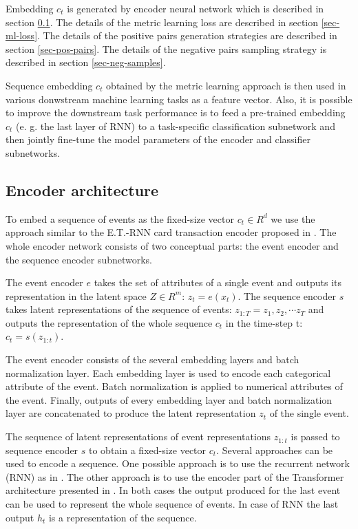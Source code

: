 \documentclass[sigconf, anonymous]{acmart}
\begin{document}
Embedding $c_t$ is generated by encoder neural network which is described in section \ref{sec-enc-arch}. The details of the metric learning loss are described in section \ref{sec-ml-loss}. The details of the positive pairs generation strategies are described in section \ref{sec-pos-pairs}. The details of the negative pairs sampling strategy is described in section \ref{sec-neg-samples}.

Sequence embedding $c_t$ obtained by the metric learning approach is then used in various donwstream machine learning tasks as a feature vector. Also, it is possible to improve the downstream task performance is to feed a pre-trained embedding $c_t$ (e. g. the last layer of RNN) to a task-specific classification subnetwork and then jointly fine-tune the model parameters of the encoder and classifier subnetworks.

\subsection{Encoder architecture} \label{sec-enc-arch}

To embed a sequence of events as the fixed-size vector $c_t \in R^d$ we use the approach similar to the E.T.-RNN card transaction encoder proposed in \cite{10.1145/3292500.3330693}. The whole encoder network consists of two conceptual parts: the event encoder and the sequence encoder subnetworks.

The event encoder $e$ takes the set of attributes of a single event and outputs its representation in the latent space $Z \in R^m$: $z_t = e(x_t)$. The sequence encoder $s$ takes latent representations of the sequence of events: $ z_{1:T} = z_1, z_2, \cdots z_T $ and outputs the representation of the whole sequence $c_t$ in the time-step t: $ c_t = s(z_{1:t}) $.

The event encoder consists of the several embedding layers and batch normalization\cite{10.5555/3045118.3045167} layer. Each embedding layer is used to encode each categorical attribute of the event. Batch normalization is applied to numerical attributes of the event. Finally, outputs of every embedding layer and batch normalization layer are concatenated to produce the latent representation $z_t$ of the single event.

The sequence of latent representations of event representations $z_{1:t}$ is passed to sequence encoder $s$ to obtain a fixed-size vector $c_t$. Several approaches can be used to encode a sequence. One possible approach is to use the recurrent network (RNN) as in \cite{Sutskever:2014:SSL:2969033.2969173}. The other approach is to use the encoder part of the Transformer architecture presented in \cite{DBLP:journals/corr/VaswaniSPUJGKP17}. In both cases the output produced for the last event can be used to represent the whole sequence of events. In case of RNN the last output $h_t$ is a representation of the sequence.
\end{document}
